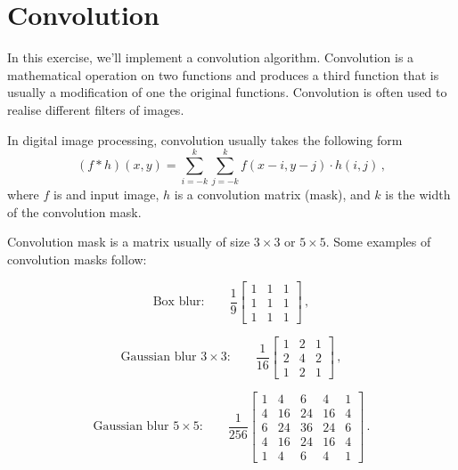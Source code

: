 \documentclass[12pt]{article}
\begin{document}
\section*{Convolution}

In this exercise, we'll implement a convolution algorithm. Convolution is a mathematical operation on two functions
and produces a third function that is usually a modification of one the original functions.
Convolution is often used to realise different filters of images.

In digital image processing, convolution usually takes the following form
\begin{equation}
    \label{eq:tri}
    (f * h)(x, y) = \sum\limits_{i=-k}^{k} \sum\limits_{j=-k}^{k} f(x - i, y - j) \cdot h(i, j) \, ,
\end{equation}
where $f$ is and input image, $h$ is a convolution matrix (mask), and $k$ is the width of the convolution mask.

Convolution mask is a matrix usually of size $3 \times 3$ or $5 \times 5$. Some examples of convolution masks follow:

\begin{equation}
    \label{eq:box_blur}
    \text{Box blur:} \quad\quad \frac{1}{9}
    \begin{bmatrix}
        1 & 1 & 1 \\
        1 & 1 & 1 \\
        1 & 1 & 1
    \end{bmatrix}
    \, ,
\end{equation}

\begin{equation}
    \label{eq:gauss_blur_3}
    \text{Gaussian blur $3 \times 3$:} \quad\quad \frac{1}{16}
    \begin{bmatrix}
        1 & 2 & 1 \\
        2 & 4 & 2 \\
        1 & 2 & 1
    \end{bmatrix}
    \, ,
\end{equation}

\begin{equation}
    \label{eq:gauss_blur_5}
    \text{Gaussian blur $5 \times 5$:} \quad\quad \frac{1}{256}
    \begin{bmatrix}
        1 & 4  & 6  & 4  & 1 \\
        4 & 16 & 24 & 16 & 4 \\
        6 & 24 & 36 & 24 & 6 \\
        4 & 16 & 24 & 16 & 4 \\
        1 & 4  & 6  & 4  & 1
    \end{bmatrix}
    \, .
\end{equation}
\end{document}
